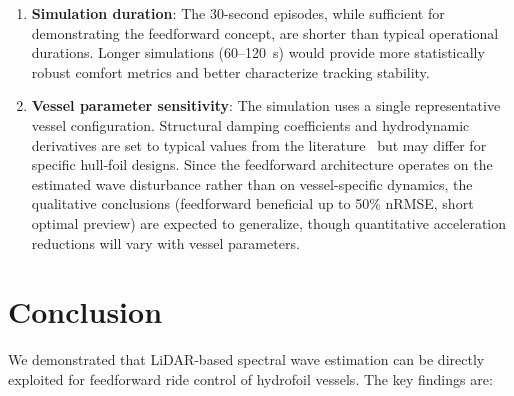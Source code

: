 \documentclass[review]{elsarticle}
\begin{document}
\begin{enumerate}
    phase misalignment that the IIR low-pass filter cannot recover.
    Directional confidence weighting or gating in the feedforward
    signal could mitigate this without requiring perfect directional
    estimation.
  \item \textbf{Simulation duration}: The 30-second episodes, while
    sufficient for demonstrating the feedforward concept, are
    shorter than typical operational durations.  Longer simulations
    (60--120~s) would provide more statistically robust comfort
    metrics and better characterize tracking stability.
  \item \textbf{Vessel parameter sensitivity}: The simulation uses a
    single representative vessel configuration.  Structural damping
    coefficients and hydrodynamic derivatives are set to typical
    values from the literature~\citep{faltinsen2005} but may differ
    for specific hull-foil designs.
    Since the feedforward architecture operates on the estimated
    wave disturbance rather than on vessel-specific dynamics, the
    qualitative conclusions (feedforward beneficial up to 50\% nRMSE,
    short optimal preview) are expected to generalize, though
    quantitative acceleration reductions will vary with vessel parameters.
\end{enumerate}

\section{Conclusion}
\label{sec:conclusion}

We demonstrated that LiDAR-based spectral wave estimation can be
directly exploited for feedforward ride control of hydrofoil vessels.
The key findings are:
\end{document}

